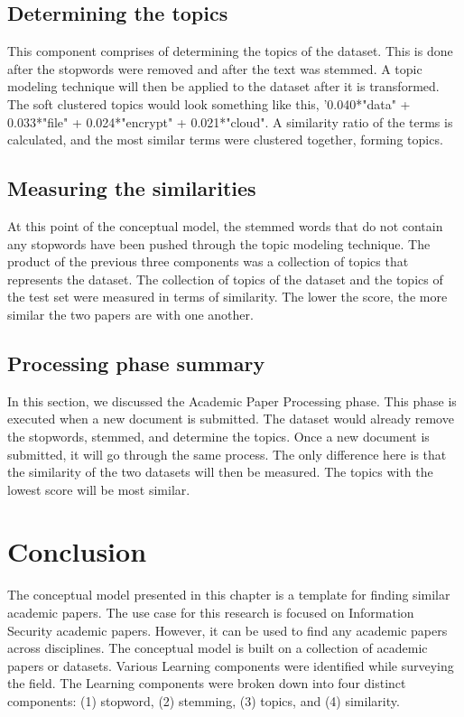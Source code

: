 \subsection{Determining the topics} \label{ssec:topic}
This component comprises of determining the topics of the dataset. This is done after the stopwords were removed and after the text was stemmed. A topic modeling technique will then be applied to the dataset after it is transformed. The soft clustered topics would look something like this, '0.040*"data" + 0.033*"file" + 0.024*"encrypt" + 0.021*"cloud".
A similarity ratio of the terms is calculated, and the most similar terms were clustered together, forming topics. 
\subsection{Measuring the similarities}
At this point of the conceptual model, the stemmed words that do not contain any stopwords have been pushed through the topic modeling technique. The product of the previous three components was a collection of topics that represents the dataset. The collection of topics of the dataset and the topics of the test set were measured in terms of similarity. The lower the score, the more similar the two papers are with one another.
\subsection{Processing phase summary}
In this section, we discussed the Academic Paper Processing phase. This phase is executed when a new document is submitted. The dataset would already remove the stopwords, stemmed, and determine the topics. Once a new document is submitted, it will go through the same process. The only difference here is that the similarity of the two datasets will then be measured. The topics with the lowest score will be most similar.
\section{Conclusion}
The conceptual model presented in this chapter is a template for finding similar academic papers. The use case for this research is focused on Information Security academic papers. However, it can be used to find any academic papers across disciplines. The conceptual model is built on a collection of academic papers or datasets. Various Learning components were identified while surveying the field. The Learning components were broken down into four distinct components: (1) stopword, (2) stemming, (3) topics, and (4) similarity. 

